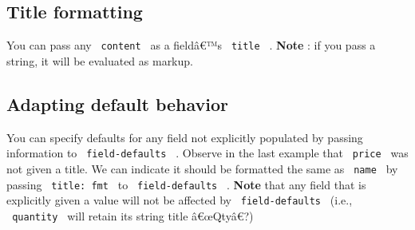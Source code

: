 \subsection{Title formatting}\label{title-formatting}

You can pass any \texttt{\ content\ } as a fieldâ€™s \texttt{\ title\ }
. \textbf{Note} : if you pass a string, it will be evaluated as markup.

\begin{Shaded}
\begin{Highlighting}[]
\NormalTok{  )}
\NormalTok{\}}

\NormalTok{)}

\end{Highlighting}
\end{Shaded}


\subsection{Adapting default behavior}\label{adapting-default-behavior}

You can specify defaults for any field not explicitly populated by
passing information to \texttt{\ field-defaults\ } . Observe in the last
example that \texttt{\ price\ } was not given a title. We can indicate
it should be formatted the same as \texttt{\ name\ } by passing
\texttt{\ title:\ fmt\ } to \texttt{\ field-defaults\ } . \textbf{Note}
that any field that is explicitly given a value will not be affected by
\texttt{\ field-defaults\ } (i.e., \texttt{\ quantity\ } will retain its
string title â€œQtyâ€?)

\begin{Shaded}
\begin{Highlighting}[]
\end{Highlighting}
\end{Shaded}

